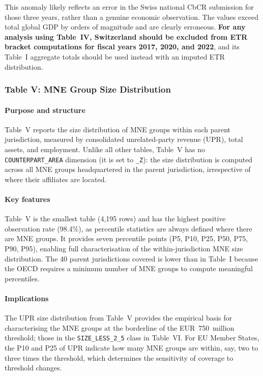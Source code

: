 \documentclass[11pt,a4paper]{article}
\newcommand{\code}[1]{\texttt{#1}}
\begin{document}
This anomaly likely reflects an error in the Swiss national CbCR submission for
those three years, rather than a genuine economic observation. The values exceed
total global GDP by orders of magnitude and are clearly erroneous. \textbf{For any
analysis using Table~IV, Switzerland should be excluded from ETR bracket
computations for fiscal years 2017, 2020, and 2022}, and its Table~I aggregate
totals should be used instead with an imputed ETR distribution.

\subsubsection{Table V: MNE Group Size Distribution}\label{sec:table5}

\paragraph{Purpose and structure}
Table~V reports the size distribution of MNE groups within each parent jurisdiction, measured by consolidated unrelated-party revenue (UPR), total assets, and employment. Unlike all other tables, Table~V has no \code{COUNTERPART\_AREA} dimension (it is set to \code{\_Z}): the size distribution is computed across all MNE groups headquartered in the parent jurisdiction, irrespective of where their affiliates are located.

\paragraph{Key features}
Table~V is the smallest table (4,195 rows) and has the highest positive observation rate (98.4\%), as percentile statistics are always defined where there are MNE groups. It provides seven percentile points (P5, P10, P25, P50, P75, P90, P95), enabling full characterisation of the within-jurisdiction MNE size distribution. The 40 parent jurisdictions covered is lower than in Table~I because the OECD requires a minimum number of MNE groups to compute meaningful percentiles.

\paragraph{Implications}
The UPR size distribution from Table~V provides the empirical basis for characterising the MNE groups at the borderline of the EUR~750~million threshold; those in the \code{SIZE\_LESS\_2\_5} class in Table~VI. For EU Member States, the P10 and P25 of UPR indicate how many MNE groups are within, say, two to three times the threshold, which determines the sensitivity of coverage to threshold changes.
\end{document}
